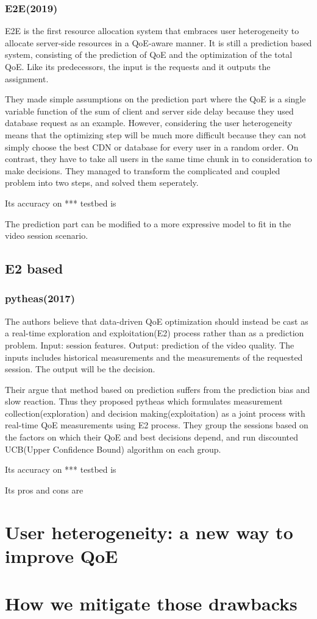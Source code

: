 \documentclass{ctexart}
\begin{document}
\subsubsection{E2E(2019)\cite{DBLP:conf/sigcomm/Zhang0KGJ19}}
\par E2E is the first resource allocation system that embraces user heterogeneity to allocate server-side resources in a QoE-aware manner. It is still a prediction based system, consisting of the prediction of QoE and the optimization of the total QoE. Like its predecessors, the input is the requests and it outputs the assignment.
\par They made simple assumptions on the prediction part where the QoE is a single variable function of the sum of client and server side delay because they used database request as an example. However, considering the user heterogeneity means that the optimizing step will be much more difficult because they can not simply choose the best CDN or database for every user in a random order. On contrast, they have to take all users in the same time chunk in to consideration to make decisions. They managed to transform the complicated and coupled problem into two steps, and solved them seperately.
\par Its accuracy on *** testbed is 
\par The prediction part can be modified to a more expressive model to fit in the video session scenario.
\subsection{E2 based}
\subsubsection{pytheas(2017)\cite{201473}}
\par The authors believe that data-driven QoE optimization should instead be cast as a real-time exploration and exploitation(E2) process rather than as a prediction problem. Input: session features. Output: prediction of the video quality. The inputs includes historical measurements and the measurements of the requested session. The output will be the decision.
\par Their argue that method based on prediction suffers from the prediction bias and slow reaction. Thus they proposed pytheas which formulates measurement collection(exploration) and decision making(exploitation) as a joint process with real-time QoE measurements using E2 process. They group the sessions based on the factors on which their QoE and best decisions depend, and run discounted UCB(Upper Confidence Bound) algorithm on each group.
\par Its accuracy on *** testbed is 
\par Its pros and cons are
\section{User heterogeneity: a new way to improve QoE}
\section{How we mitigate those drawbacks}


\nocite{*}


\end{document}
